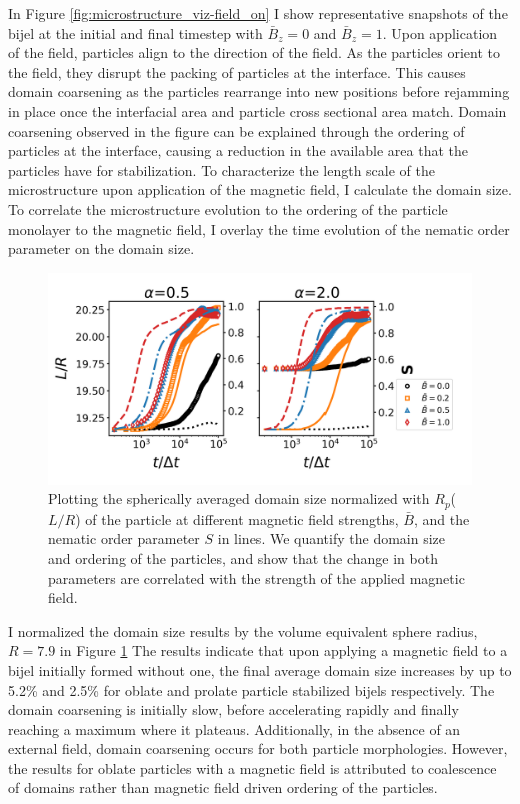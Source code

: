 In Figure \ref{fig:microstructure_viz-field_on} I show representative snapshots of the bijel at the initial and final timestep with $\bar{B}_z = 0$ and $\bar{B}_z = 1$. 
Upon application of the field, particles align to the direction of the field. As the particles orient to the field, they disrupt the packing of particles at
the interface. This causes domain coarsening as the particles rearrange into new positions before rejamming in place once the interfacial
area and particle cross sectional area match. Domain coarsening observed in the figure can be explained through the ordering of particles at the interface, causing a 
reduction in the available area that the particles have for stabilization. To characterize the length scale of the microstructure upon application of the magnetic field,
I calculate the domain size. To correlate the microstructure evolution to the ordering of the particle monolayer to the magnetic field, I overlay the time evolution of the
nematic order parameter on the domain size. \cite{veerman_phase_1992} 

\begin{figure} 
\centering 
\includegraphics[scale=0.5]{../figures/results/paper2/domain_size-field_on.png} 
\caption{Plotting the spherically averaged domain size normalized with $R_p$($L/R$) of the particle at different magnetic field strengths, $\bar{B}$, and the nematic order parameter $S$ in lines. We quantify the domain size and ordering of the particles, and show that the change in both parameters are correlated with the strength of the applied magnetic field.} 
\label{fig:domain_size-field_on} 
\end{figure}

I normalized the domain size results by the volume equivalent sphere radius, $R = 7.9$ in Figure \ref{fig:domain_size-field_on} The results indicate that upon 
applying a magnetic field to a bijel initially formed without one, the final average domain size increases by up to 5.2\% and 2.5\% for oblate and 
prolate particle stabilized bijels respectively. The domain coarsening is initially slow, before accelerating rapidly and finally reaching a maximum where it plateaus. 
Additionally, in the absence of an external field, domain coarsening occurs for both particle morphologies. However, the results
for oblate particles with a magnetic field is attributed to coalescence of domains rather than magnetic field driven ordering of the particles.

